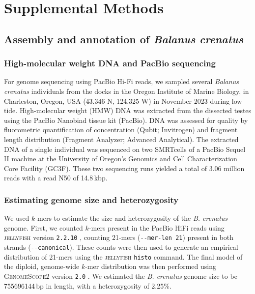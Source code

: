\section*{Supplemental Methods}

\subsection*{Assembly and annotation of \textit{Balanus crenatus}}\label{sec:sup_methods_balcre}

\subsubsection*{High-molecular weight DNA and PacBio sequencing}

For genome sequencing using PacBio Hi-Fi reads, we sampled several \textit{Balanus
crenatus} individuals from the docks in the Oregon Institute of Marine Biology, in
Charleston, Oregon, USA (43.346 N, 124.325 W) in November 2023 during low tide.
High-molecular weight (HMW) DNA was extracted from the dissected testes using the 
PacBio Nanobind tissue kit (PacBio).
DNA was assessed for quality by fluorometric quantification of concentration (Qubit;
Invitrogen) and fragment length distribution (Fragment Analyzer; Advanced Analytical).
The extracted DNA of a single individual was sequenced on two SMRTcells of a PacBio
Sequel II machine at the University of Oregon's Genomics and Cell Characterization
Core Facility (GC3F).
These two sequencing runs yielded a total of 3.06 million reads with a read N50 of
14.8\,kbp.

\subsubsection*{Estimating genome size and heterozygosity}

We used $k$-mers to estimate the size and heterozygosity of the \textit{B.
crenatus} genome.
First, we counted $k$-mers present in the PacBio HiFi reads using
\textsc{jellyfish} version \texttt{2.2.10} \citep{marcais_fast_2011}, counting
21-mers (\texttt{-{}-mer-len 21}) present in both strands (\texttt{-{}-canonical}).
These counts were then used to generate an empirical distribution of 21-mers
using the \textsc{jellyfish} \texttt{histo} command.
The final model of the diploid, genome-wide $k$-mer distribution was then performed
using \textsc{GenomeScope2} version \texttt{2.0}
\citep{ranallo-benavidez_genomescope_2020}.
We estimated the \textit{B. crenatus} genome size to be \num{755696144}\,bp in length,
with a heterozygosity of 2.25\%.

